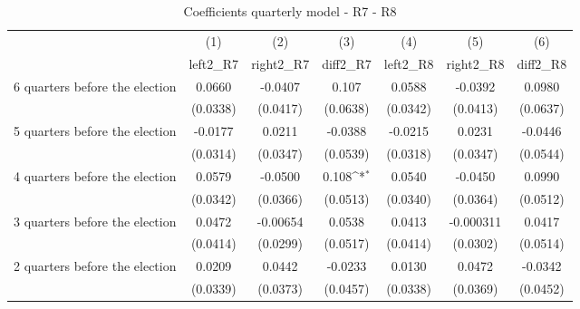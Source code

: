 \begin{table}[!ht]\centering \footnotesize
\def\sym#1{\ifmmode^{#1}\else\(^{#1}\)\fi}
\caption{Coefficients quarterly model - R7 - R8}
\begin{tabular}{l*{6}{c}}
\hline\hline
                    &\multicolumn{1}{c}{(1)}&\multicolumn{1}{c}{(2)}&\multicolumn{1}{c}{(3)}&\multicolumn{1}{c}{(4)}&\multicolumn{1}{c}{(5)}&\multicolumn{1}{c}{(6)}\\
                    &\multicolumn{1}{c}{left2\_R7}&\multicolumn{1}{c}{right2\_R7}&\multicolumn{1}{c}{diff2\_R7}&\multicolumn{1}{c}{left2\_R8}&\multicolumn{1}{c}{right2\_R8}&\multicolumn{1}{c}{diff2\_R8}\\
\hline
 6 quarters before the election&      0.0660         &     -0.0407         &       0.107         &      0.0588         &     -0.0392         &      0.0980         \\
                    &    (0.0338)         &    (0.0417)         &    (0.0638)         &    (0.0342)         &    (0.0413)         &    (0.0637)         \\
[1em]
 5 quarters before the election&     -0.0177         &      0.0211         &     -0.0388         &     -0.0215         &      0.0231         &     -0.0446         \\
                    &    (0.0314)         &    (0.0347)         &    (0.0539)         &    (0.0318)         &    (0.0347)         &    (0.0544)         \\
[1em]
 4 quarters before the election&      0.0579         &     -0.0500         &       0.108\sym{*}  &      0.0540         &     -0.0450         &      0.0990         \\
                    &    (0.0342)         &    (0.0366)         &    (0.0513)         &    (0.0340)         &    (0.0364)         &    (0.0512)         \\
[1em]
 3 quarters before the election&      0.0472         &    -0.00654         &      0.0538         &      0.0413         &   -0.000311         &      0.0417         \\
                    &    (0.0414)         &    (0.0299)         &    (0.0517)         &    (0.0414)         &    (0.0302)         &    (0.0514)         \\
[1em]
 2 quarters before the election&      0.0209         &      0.0442         &     -0.0233         &      0.0130         &      0.0472         &     -0.0342         \\
                    &    (0.0339)         &    (0.0373)         &    (0.0457)         &    (0.0338)         &    (0.0369)         &    (0.0452)         \\

\end{tabular}
\end{table}
